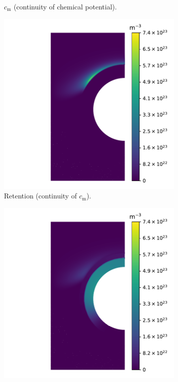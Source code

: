 \begin{figure}
\begin{subfigure}{0.5\linewidth}
        \caption{$c_\mathrm{m}$ (continuity of chemical potential).}
    \end{subfigure}
    \begin{subfigure}{0.5\linewidth}
        \centering
        \includegraphics[width=\linewidth]{Figures/Chapter3/monoblocks/interface_condition/iter case/retention_concentration.pdf}
        \caption{Retention (continuity of $c_\mathrm{m}$).}
    \end{subfigure}%
    \begin{subfigure}{0.5\linewidth}
        \centering
        \includegraphics[width=\linewidth]{Figures/Chapter3/monoblocks/interface_condition/iter case/retention_chemical_pot.pdf}

\end{subfigure}
\end{figure}
